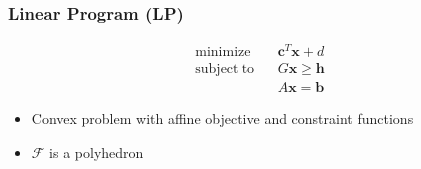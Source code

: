\subsubsection*{Linear Program (LP)}
\begin{equation}\begin{aligned}
    \mathrm{minimize}~~&~~\mathbf{c}^T \mathbf{x} + d \\
    \mathrm{subject~to}~~&~~G\mathbf{x} \geq \mathbf{h} \\
        &~~A\mathbf{x} = \mathbf{b}
\end{aligned}\end{equation}
\begin{itemize}
    \item Convex problem with affine objective and constraint functions
    \item $\mathcal{F}$ is a polyhedron
\end{itemize}

